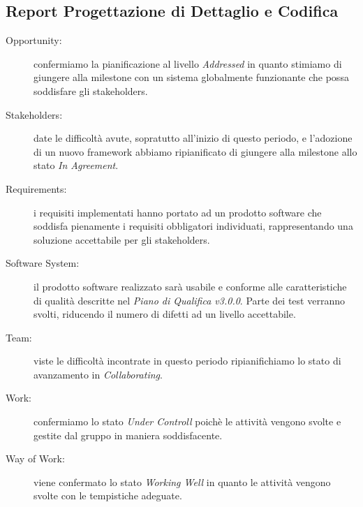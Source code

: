 \subsection{Report Progettazione di Dettaglio e Codifica}
\begin{description}
	\item[Opportunity:] confermiamo la pianificazione al livello \textit{Addressed} in quanto stimiamo di giungere alla \gls{milestone} con un sistema globalmente funzionante che possa soddisfare gli \gls{stakeholders}.
	\item[Stakeholders:] date le difficoltà avute, sopratutto all'inizio di questo periodo, e l'adozione di un nuovo \gls{framework} abbiamo ripianificato di giungere alla \gls{milestone} allo stato \textit{In Agreement}.
	\item[Requirements:] i requisiti implementati hanno portato ad un prodotto software che soddisfa pienamente i requisiti obbligatori individuati, rappresentando una soluzione accettabile per gli \gls{stakeholders}. 
	\item[Software System:] il prodotto software realizzato sarà usabile e conforme alle caratteristiche di qualità descritte nel \textit{Piano di Qualifica v3.0.0}. Parte dei test verranno svolti, riducendo il numero di difetti ad un livello accettabile.
	\item[Team:] viste le difficoltà incontrate in questo periodo ripianifichiamo lo stato di avanzamento in \textit{Collaborating}.
	\item[Work:] confermiamo lo stato \textit{Under Controll} poichè le attività vengono svolte e gestite dal gruppo in maniera soddisfacente.
	\item[Way of Work:] viene confermato lo stato \textit{Working Well} in quanto le attività vengono svolte con le tempistiche adeguate. 
\end{description}

